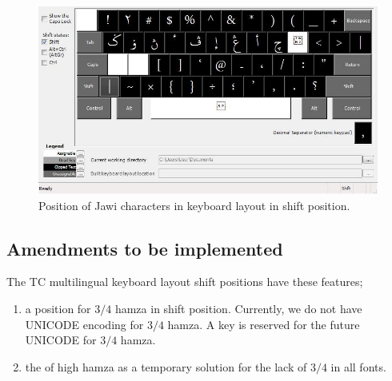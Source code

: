 \documentclass[12pt,a4paper]{IEEEconf}
\begin{document}
\begin{center}
\begin{figure}[th] \label{fig:jawi1}
\caption{Position of Jawi characters in keyboard layout in shift position.}
\includegraphics[width=\columnwidth]{arabjawiShft.jpg}
\end{figure}
\end{center}

\subsection{Amendments to be implemented}

The TC multilingual keyboard layout shift positions have these features;
\begin{enumerate}
\item a position for $3/4$ hamza in shift position. Currently, we do not have UNICODE encoding for $3/4$ hamza. A key is reserved for the future UNICODE for $3/4$ hamza.
\item the of high hamza  {} as a temporary solution for the lack of $3/4$ in all fonts.
\end{enumerate}



\end{document}
